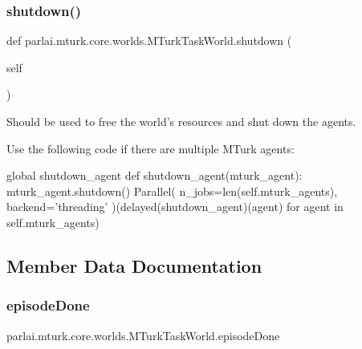 \subsubsection{\texorpdfstring{shutdown()}{shutdown()}}
{\footnotesize\ttfamily def parlai.\+mturk.\+core.\+worlds.\+M\+Turk\+Task\+World.\+shutdown (\begin{DoxyParamCaption}\item[{}]{self }\end{DoxyParamCaption})}

\begin{DoxyVerb}Should be used to free the world's resources and shut down the agents.

Use the following code if there are multiple MTurk agents:

global shutdown_agent
def shutdown_agent(mturk_agent):
    mturk_agent.shutdown()
Parallel(
    n_jobs=len(self.mturk_agents),
    backend='threading'
)(delayed(shutdown_agent)(agent) for agent in self.mturk_agents)
\end{DoxyVerb}
 

\subsection{Member Data Documentation}
\mbox{\label{classparlai_1_1mturk_1_1core_1_1worlds_1_1MTurkTaskWorld_ab54f79ffe393a5c0bb185f61e5809522}} 
\subsubsection{\texorpdfstring{episode\+Done}{episodeDone}}
{\footnotesize\ttfamily parlai.\+mturk.\+core.\+worlds.\+M\+Turk\+Task\+World.\+episode\+Done}

\mbox{\label{classparlai_1_1mturk_1_1core_1_1worlds_1_1MTurkTaskWorld_ae9fb1250e0b9a2f77efa255458e47fb3}} 
